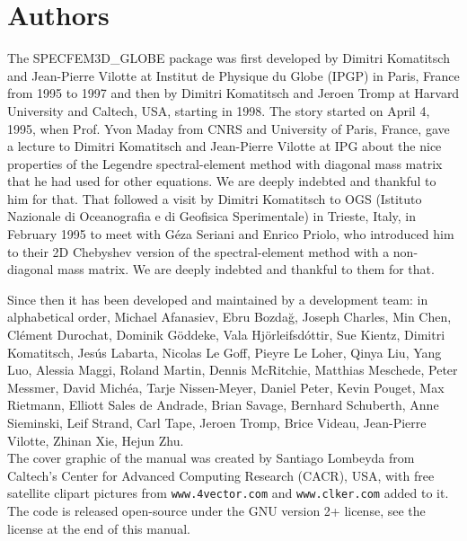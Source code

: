 \documentclass[oneside,english]{book}
\begin{document}
\section*{Authors}
The SPECFEM3D\_GLOBE package was first developed by Dimitri Komatitsch and Jean-Pierre Vilotte at Institut de Physique du Globe (IPGP) in Paris, France
from 1995 to 1997 and then by Dimitri Komatitsch and Jeroen Tromp at Harvard University and Caltech, USA, starting in 1998.
The story started on April 4, 1995, when Prof. Yvon Maday from CNRS and University of Paris, France, gave a lecture to
Dimitri Komatitsch and Jean-Pierre Vilotte at IPG about the nice properties of the Legendre spectral-element method with diagonal mass matrix that he had used for
other equations. We are deeply indebted and thankful to him for that.
That followed a visit by Dimitri Komatitsch to OGS (Istituto Nazionale di Oceanografia e di Geofisica Sperimentale) in Trieste, Italy, in February 1995
to meet with G\'eza Seriani and Enrico Priolo, who introduced him to their 2D Chebyshev version of the spectral-element method with a non-diagonal mass matrix.
We are deeply indebted and thankful to them for that.

Since then it has been developed and maintained by a development team: in alphabetical order,
Michael Afanasiev,
Ebru Bozda\u{g},
Joseph Charles,
Min Chen,
Cl\'ement Durochat,
Dominik G\"oddeke,
Vala Hj\"orleifsd\'ottir,
Sue Kientz,
Dimitri Komatitsch,
Jes\'us Labarta,
Nicolas Le Goff,
Pieyre Le Loher,
Qinya Liu,
Yang Luo,
Alessia Maggi,
Roland Martin,
Dennis McRitchie,
Matthias Meschede,
Peter Messmer,
David Mich\'ea,
Tarje Nissen-Meyer,
Daniel Peter,
Kevin Pouget,
Max Rietmann,
Elliott Sales de Andrade,
Brian Savage,
Bernhard Schuberth,
Anne Sieminski,
Leif Strand,
Carl Tape,
Jeroen Tromp,
Brice Videau,
Jean-Pierre Vilotte,
Zhinan Xie,
Hejun Zhu.\\

The cover graphic of the manual was created
by Santiago Lombeyda from Caltech's Center for Advanced Computing Research (CACR), USA, with free satellite clipart pictures
from \texttt{www.4vector.com} and \texttt{www.clker.com} added to it.\\

The code is released open-source under the GNU version 2+ license, see the license at the end of this manual.\\

\newpage{}
\end{document}
